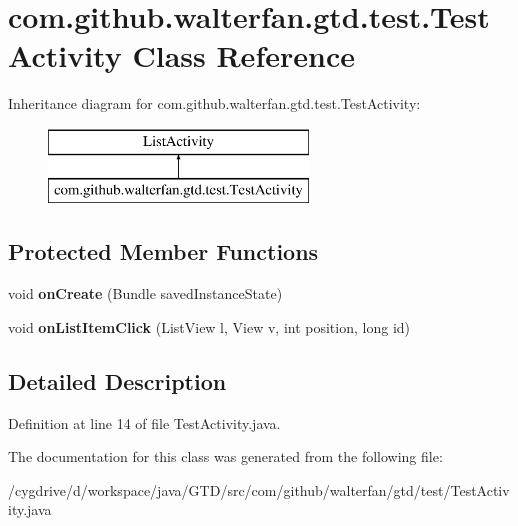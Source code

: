 \hypertarget{classcom_1_1github_1_1walterfan_1_1gtd_1_1test_1_1TestActivity}{\section{com.\-github.\-walterfan.\-gtd.\-test.\-Test\-Activity Class Reference}
\label{classcom_1_1github_1_1walterfan_1_1gtd_1_1test_1_1TestActivity}
}
Inheritance diagram for com.\-github.\-walterfan.\-gtd.\-test.\-Test\-Activity\-:\begin{figure}[H]
\begin{center}
\leavevmode
\includegraphics[height=2.000000cm]{classcom_1_1github_1_1walterfan_1_1gtd_1_1test_1_1TestActivity}
\end{center}
\end{figure}
\subsection*{Protected Member Functions}
\begin{DoxyCompactItemize}
\item 
\hypertarget{classcom_1_1github_1_1walterfan_1_1gtd_1_1test_1_1TestActivity_a9ae50fcdb8df9d0e5381593a52b46e9a}{void {\bfseries on\-Create} (Bundle saved\-Instance\-State)}\label{classcom_1_1github_1_1walterfan_1_1gtd_1_1test_1_1TestActivity_a9ae50fcdb8df9d0e5381593a52b46e9a}

\item 
\hypertarget{classcom_1_1github_1_1walterfan_1_1gtd_1_1test_1_1TestActivity_a12c48a0db11e934eb1452888ad3cb2df}{void {\bfseries on\-List\-Item\-Click} (List\-View l, View v, int position, long id)}\label{classcom_1_1github_1_1walterfan_1_1gtd_1_1test_1_1TestActivity_a12c48a0db11e934eb1452888ad3cb2df}

\end{DoxyCompactItemize}


\subsection{Detailed Description}


Definition at line 14 of file Test\-Activity.\-java.



The documentation for this class was generated from the following file\-:\begin{DoxyCompactItemize}
\item 
/cygdrive/d/workspace/java/\-G\-T\-D/src/com/github/walterfan/gtd/test/Test\-Activity.\-java\end{DoxyCompactItemize}
